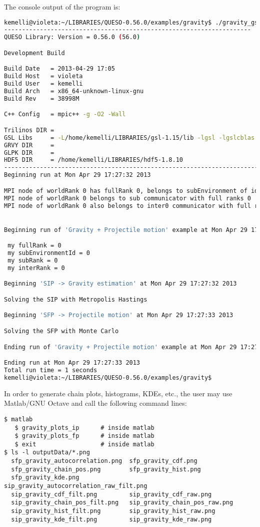 The console output of the program is:
\begin{lstlisting}[caption={Console output of program \texttt{gravity\_gsl}}, label={code:console_output},language={bash}]
kemelli@violeta:~/LIBRARIES/QUESO-0.56.0/examples/gravity$ ./gravity_gsl gravity_inv_fwd.inp
---------------------------------------------------------------------
QUESO Library: Version = 0.56.0 (56.0)

Development Build

Build Date   = 2013-04-29 17:05
Build Host   = violeta
Build User   = kemelli
Build Arch   = x86_64-unknown-linux-gnu
Build Rev    = 38998M

C++ Config   = mpic++ -g -O2 -Wall

Trilinos DIR =
GSL Libs     = -L/home/kemelli/LIBRARIES/gsl-1.15/lib -lgsl -lgslcblas -lm
GRVY DIR     =
GLPK DIR     =
HDF5 DIR     = /home/kemelli/LIBRARIES/hdf5-1.8.10
--------------------------------------------------------------------------------------------------------------
Beginning run at Mon Apr 29 17:27:32 2013

MPI node of worldRank 0 has fullRank 0, belongs to subEnvironment of id 0, and has subRank 0
MPI node of worldRank 0 belongs to sub communicator with full ranks 0
MPI node of worldRank 0 also belongs to inter0 communicator with full ranks 0, and has inter0Rank 0


Beginning run of 'Gravity + Projectile motion' example at Mon Apr 29 17:27:32 2013

 my fullRank = 0
 my subEnvironmentId = 0
 my subRank = 0
 my interRank = 0

Beginning 'SIP -> Gravity estimation' at Mon Apr 29 17:27:32 2013

Solving the SIP with Metropolis Hastings

Beginning 'SFP -> Projectile motion' at Mon Apr 29 17:27:33 2013

Solving the SFP with Monte Carlo

Ending run of 'Gravity + Projectile motion' example at Mon Apr 29 17:27:33 2013

Ending run at Mon Apr 29 17:27:33 2013
Total run time = 1 seconds
kemelli@violeta:~/LIBRARIES/QUESO-0.56.0/examples/gravity$
\end{lstlisting}


In order to generate chain plots, histograms, KDEs, etc., the user may use Matlab/GNU Octave and call
the following command lines:
\begin{lstlisting}
$ matlab
   $ gravity_plots_ip      # inside matlab
   $ gravity_plots_fp      # inside matlab
   $ exit                  # inside matlab
$ ls -l outputData/*.png
  sfp_gravity_autocorrelation.png  sfp_gravity_cdf.png
  sfp_gravity_chain_pos.png        sfp_gravity_hist.png
  sfp_gravity_kde.png              sip_gravity_autocorrelation_raw_filt.png
  sip_gravity_cdf_filt.png         sip_gravity_cdf_raw.png
  sip_gravity_chain_pos_filt.png   sip_gravity_chain_pos_raw.png
  sip_gravity_hist_filt.png        sip_gravity_hist_raw.png
  sip_gravity_kde_filt.png         sip_gravity_kde_raw.png
\end{lstlisting}


